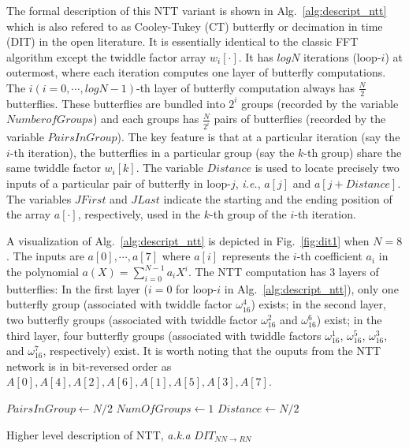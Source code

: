 \documentclass{iacrtrans}
\theoremstyle{plain}
\begin{document}
The formal description of this NTT variant is shown in Alg.~\ref{alg:descript_ntt} which is also refered to as Cooley-Tukey (CT) butterfly or decimation in time (DIT) in the open literature. It is essentially identical to the classic FFT algorithm except the twiddle factor array $w_i[\cdot]$. It has $logN$ iterations (loop-$i$) at outermost, where each iteration computes one layer of butterfly computations.  The $i(i=0,\cdots,logN-1)$-th layer of butterfly computation always has $\frac{N}{2}$ butterflies. These butterflies are bundled into $2^i$ groups (recorded by the variable $NumberofGroups$) and each groups has $\frac{N}{2^i}$ pairs of butterflies (recorded by the variable $PairsInGroup$). The key feature is that at a particular iteration (say the $i$-th iteration), the butterflies in a particular group (say the $k$-th group) share the same twiddle factor $w_i[k]$. The variable $Distance$ is used to locate precisely two inputs of a particular pair of butterfly in loop-$j$, \textit{i.e.}, $a[j]$ and $a[j+Distance]$. The variables $JFirst$ and $JLast$ indicate the starting and the ending position of the array $a[\cdot]$, respectively, used in the $k$-th group of the $i$-th iteration.

A visualization of Alg.~\ref{alg:descript_ntt} is depicted in Fig.~\ref{fig:dit1} when $N=8$. The inputs are $a[0],\cdots,a[7]$ where $a[i]$ represents the $i$-th coefficient $a_i$ in the polynomial $a(X)=\sum_{i=0}^{N-1}a_iX^i$. The NTT computation has 3 layers of butterflies: In the first layer ($i=0$ for loop-$i$ in Alg.~\ref{alg:descript_ntt}), only one butterfly group (associated with twiddle factor $\omega_{16}^4$) exists; in the second layer, two butterfly groups (associated with twiddle factor $\omega_{16}^2$ and $\omega_{16}^6$) exist; in the third layer, four butterfly groups (associated with twiddle factors $\omega_{16}^1$, $\omega_{16}^5$, $\omega_{16}^3$, and $\omega_{16}^7$, respectively) exist. It is worth noting that the ouputs from the NTT network is in bit-reversed order as $A[0],A[4],A[2],A[6],A[1],A[5],A[3],A[7]$.

\begin{algorithm}[!tbh]
 \DontPrintSemicolon %
    $PairsInGroup \gets N/2$\;
    $NumOfGroups \gets 1$\;
    $Distance \gets N/2$\;
 \caption{Higher level description of NTT, \textit{a.k.a} $DIT_{NN\to RN}$}\label{alg:descript_ntt}
\end{algorithm}
\end{document}
